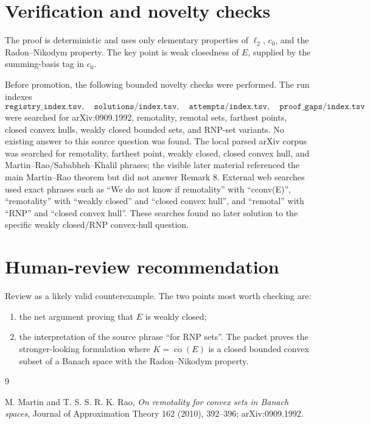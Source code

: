 \documentclass[11pt]{article}
\newcommand{\clco}{\overline{\operatorname{co}}}
\begin{document}
\section*{Verification and novelty checks}

The proof is deterministic and uses only elementary properties of
\(\ell_2\), \(c_0\), and the Radon--Nikodym property.  The key point is
weak closedness of \(E\), supplied by the summing-basis tag in \(c_0\).

Before promotion, the following bounded novelty checks were performed.
The run indexes
\[
\texttt{registry\_index.tsv},\quad \texttt{solutions/index.tsv},\quad
\texttt{attempts/index.tsv},\quad \texttt{proof\_gaps/index.tsv}
\]
were searched for arXiv:0909.1992, remotality, remotal sets, farthest points,
closed convex hulls, weakly closed bounded sets, and RNP-set variants.  No
existing answer to this source question was found.  The local parsed arXiv
corpus was searched for remotality, farthest point, weakly closed, closed
convex hull, and Martin--Rao/Sababheh--Khalil phrases; the visible later
material referenced the main Martin--Rao theorem but did not answer Remark 8.
External web searches used exact phrases such as ``We do not know if
remotality'' with ``cconv(E)'', ``remotality'' with ``weakly closed'' and
``closed convex hull'', and ``remotal'' with ``RNP'' and ``closed convex
hull''.  These searches
found no later solution to the specific weakly closed/RNP convex-hull question.

\section*{Human-review recommendation}

Review as a likely valid counterexample.  The two points most worth checking
are:
\begin{enumerate}
  \item the net argument proving that \(E\) is weakly closed;
  \item the interpretation of the source phrase ``for RNP sets''.  The packet
  proves the stronger-looking formulation where \(K=\clco(E)\) is a closed
  bounded convex subset of a Banach space with the Radon--Nikodym property.
\end{enumerate}

\begin{thebibliography}{9}

M. Martin and T. S. S. R. K. Rao,
\emph{On remotality for convex sets in Banach spaces},
Journal of Approximation Theory 162 (2010), 392--396;
arXiv:0909.1992.

\end{thebibliography}
\end{document}
